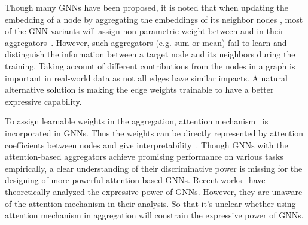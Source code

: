 \documentclass[letterpaper]{article} \usepackage{aaai20}  \usepackage{times}  \usepackage{helvet} \usepackage{courier}  \usepackage[hyphens]{url}  \usepackage{graphicx} \urlstyle{rm} \def\UrlFont{\rm}  \usepackage{graphicx}  \frenchspacing  \setlength{\pdfpagewidth}{8.5in}  \setlength{\pdfpageheight}{11in}
\theoremstyle{plain}
\theoremstyle{definition}
\begin{document}
Though many GNNs have been proposed, it is noted that when updating the embedding of a node  by aggregating the embeddings of its neighbor nodes , most of the GNN variants will assign non-parametric weight between  and  in their aggregators~\cite{kipf2017semi,hamilton2017inductive,xu2018how}. However, such aggregators (e.g. sum or mean) fail to learn and distinguish the information between a target node and its neighbors during the training. Taking account of different contributions from the nodes in a graph is important in real-world data as not all edges have similar impacts. A natural alternative solution is making the edge weights trainable to have a better expressive capability.

To assign learnable weights in the aggregation, attention mechanism~\cite{bahdanau2014neural,vaswani2017attention} is incorporated in GNNs. Thus the weights can be directly represented by attention coefficients between nodes and give interpretability~\cite{velickovic2018graph,thekumparampil2018attention,zhou2018commonsense}. Though GNNs with the attention-based aggregators achieve promising performance on various tasks empirically, a clear understanding of their discriminative power is missing for the designing of more powerful attention-based GNNs. Recent works~\cite{morris2019weisfeiler,xu2018how,maron2019provably} have theoretically analyzed the expressive power of GNNs. However, they are unaware of the attention mechanism in their analysis. So that it's unclear whether using attention mechanism in aggregation will constrain the expressive power of GNNs.
\end{document}
